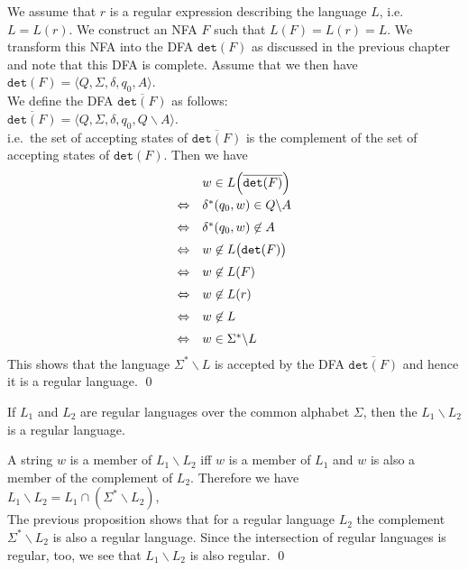 \proofEng
We assume that $r$ is a regular expression describing the language $L$, i.e.~$L=L(r)$. 
We construct an \textsc{NFA} $F$ such that $L(F) = L(r) = L$.  
We transform this \textsc{NFA} into the \textsc{DFA} $\mathtt{det}(F)$ as discussed
in the previous chapter and note that this \textsc{DFA} is complete.
Assume that we then have
\\[0.2cm]
\hspace*{1.3cm} $\mathtt{det}(F) = \langle Q, \Sigma, \delta, q_0, A \rangle$.
\\[0.2cm]
We define the  \textsc{DFA} $\overline{\mathtt{det}(F)}$ as follows:
\\[0.2cm]
\hspace*{1.3cm} $\overline{\mathtt{det}(F)} = \langle Q, \Sigma, \delta, q_0, Q \backslash A \rangle$.
\\[0.2cm]
i.e.~the set of accepting states of $\overline{\mathtt{det}(F)}$ is the complement of the set of accepting
states of $\mathtt{det}(F)$.  Then we have
$$
\begin{array}[t]{cl}
                  & w \in L\Bigl(\overline{\mathtt{det}(F)}\Bigr)                      \\[0.2cm]
  \Leftrightarrow & \delta^*(q_0, w) \in Q \backslash A     \\[0.2cm]
  \Leftrightarrow & \delta^*(q_0, w) \not\in A \\[0.2cm]
  \Leftrightarrow & w \not\in L\bigl(\mathtt{det}(F)\bigr) \\[0.2cm]
  \Leftrightarrow & w \not\in L(F) \\[0.2cm]
  \Leftrightarrow & w \not\in L(r) \\[0.2cm]
  \Leftrightarrow & w \not\in L \\[0.2cm]
  \Leftrightarrow & w \in \Sigma^* \backslash L 
 \end{array}
$$
This shows that the language $\Sigma^* \backslash L$ is accepted by the \textsc{DFA} $\overline{\mathtt{det}(F)}$
and hence it is a regular language.
 \qed

\begin{Corollary} \label{kor:mengendif}
  If $L_1$ and $L_2$ are regular languages over the common alphabet $\Sigma$, then the 
   $L_1 \backslash L_2$  is a regular language.
\end{Corollary}

\proofEng
A string $w$ is a member of $L_1 \backslash L_2$ iff $w$ is a member of $L_1$
and $w$ is also a member of the complement of $L_2$.  Therefore we have
\\[0.2cm]
\hspace*{1.3cm}
$L_1 \backslash L_2 = L_1 \cap (\Sigma^* \backslash L_2)$,
\\[0.2cm]
The previous proposition shows that for a regular language $L_2$ the complement
$\Sigma^* \backslash L_2$ is also a regular language.  Since the intersection of regular languages is regular,
too, we see that $L_1 \backslash L_2$ is also regular.
\qed
\vspace*{0.3cm}

